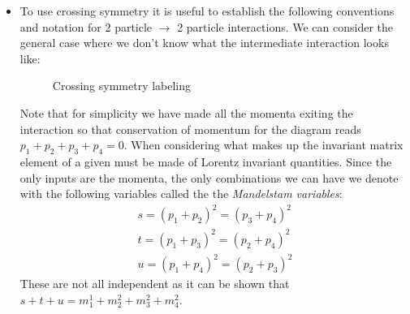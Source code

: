 \documentclass[11pt]{article}
\numberwithin{equation}{section}
\begin{document}
\begin{itemize}
  \item To use crossing symmetry it is useful to establish the following conventions and notation for 2 particle $\rightarrow$ 2 particle interactions. We can consider the general case where we don't know what the intermediate interaction looks like:
\begin{figure}[H]
\centering
{}
\caption{Crossing symmetry labeling}
\label{fig:cross}
\end{figure}
Note that for simplicity we have made all the momenta exiting the interaction so that conservation of momentum for the diagram reads $p_1+p_2+p_3+p_4=0$. When considering what makes up the invariant matrix element of a given must be made of Lorentz invariant quantities. Since the only inputs are the momenta, the only combinations we can have we denote with the following variables called the the \emph{Mandelstam variables}:
\begin{align*}
    s =(p_1+p_2)^2 = (p_3+p_4)^2 \\
    t = (p_1+p_3)^2 = (p_2+p_4)^2 \\
    u = (p_1+p_4)^2 = (p_2+p_3)^2 
\end{align*}
These are not all independent as it can be shown that $s+t+u = m_1^1+m_2^2+m_3^2+m_4^2$. 


\end{itemize}
\end{document}
